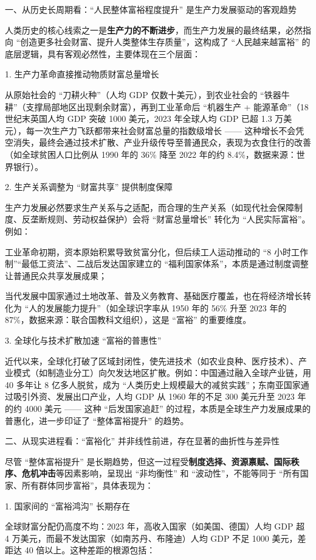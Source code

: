 \documentclass[12pt,oneside]{book}
\begin{document}
一、从历史长周期看：“人民整体富裕程度提升” 是生产力发展驱动的客观趋势

人类历史的核心线索之一是\textbf{生产力的不断进步}，而生产力发展的最终结果，必然指向 “创造更多社会财富、提升人类整体生存质量”，这构成了 “人民越来越富裕” 的底层逻辑，具有客观必然性，主要体现在三个层面：

1.  生产力革命直接推动物质财富总量增长

从原始社会的 “刀耕火种”（人均 GDP 仅数十美元），到农业社会的 “铁器牛耕”（支撑局部地区出现剩余财富），再到工业革命后 “机器生产 + 能源革命”（18 世纪末英国人均 GDP 突破 1000 美元，2023 年全球人均 GDP 已超 1.3 万美元），每一次生产力飞跃都带来社会财富总量的指数级增长 —— 这种增长不会凭空消失，最终会通过技术扩散、产业升级传导至普通民众，表现为衣食住行的改善（如全球贫困人口比例从 1990 年的 36\% 降至 2022 年的约 8.4\%，数据来源：世界银行）。

2.  生产关系调整为 “财富共享” 提供制度保障

生产力发展必然要求生产关系与之适配，而合理的生产关系（如现代社会保障制度、反垄断规则、劳动权益保护）会将 “财富总量增长” 转化为 “人民实际富裕”。例如：

工业革命初期，资本原始积累导致贫富分化，但后续工人运动推动的 “8 小时工作制”“最低工资法”、二战后发达国家建立的 “福利国家体系”，本质是通过制度调整让普通民众共享发展成果；

当代发展中国家通过土地改革、普及义务教育、基础医疗覆盖，也在将经济增长转化为 “人的发展能力提升”（如全球识字率从 1950 年的 56\% 升至 2023 年的 87\%，数据来源：联合国教科文组织），这是 “富裕” 的重要维度。

3. 全球化与技术扩散加速 “富裕的普惠性”

近代以来，全球化打破了区域封闭性，使先进技术（如农业良种、医疗技术）、产业模式（如制造业分工）向欠发达地区扩散。例如：中国通过融入全球产业链，用 40 多年让 8 亿多人脱贫，成为 “人类历史上规模最大的减贫实践”；东南亚国家通过吸引外资、发展出口产业，人均 GDP 从 1960 年的不足 300 美元升至 2023 年的约 4000 美元 —— 这种 “后发国家追赶” 的过程，本质是全球生产力发展成果的普惠化，进一步印证了 “整体富裕提升” 的趋势。

二、从现实进程看：“富裕化” 并非线性前进，存在显著的曲折性与差异性

尽管 “整体富裕提升” 是长期趋势，但这一过程受\textbf{制度选择、资源禀赋、国际秩序、危机冲击}等因素影响，呈现出 “非均衡性” 和 “波动性”，不能等同于 “所有国家、所有群体同步富裕”，具体表现为：

1.  国家间的 “富裕鸿沟” 长期存在

全球财富分配仍高度不均：2023 年，高收入国家（如美国、德国）人均 GDP 超 4 万美元，而最不发达国家（如南苏丹、布隆迪）人均 GDP 不足 1000 美元，差距达 40 倍以上。这种差距的根源包括：
\end{document}
